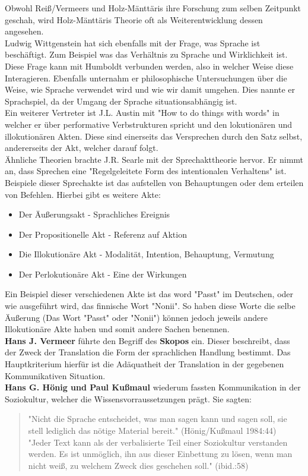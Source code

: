 \documentclass{article}
\begin{document}
	Obwohl Reiß/Vermeers und Holz-Mänttäris ihre Forschung zum selben Zeitpunkt geschah, wird Holz-Mänttäris Theorie oft als Weiterentwicklung dessen angesehen. \\
	Ludwig Wittgenstein hat sich ebenfalls mit der Frage, was Sprache ist beschäftigt. Zum Beispiel was das Verhältnis zu Sprache und Wirklichkeit ist. Diese Frage kann mit Humboldt verbunden werden, also in welcher Weise diese Interagieren. Ebenfalls unternahm er philosophische Untersuchungen über die Weise, wie Sprache verwendet wird und wie wir damit umgehen. Dies nannte er Sprachspiel, da der Umgang der Sprache situationsabhängig ist. \\
	Ein weiterer Vertreter ist J.L. Austin mit "How to do things with words" in welcher er über performative Verbstrukturen spricht und den lokutionären und illokutionären Akten. Diese sind einerseits das Versprechen durch den Satz selbst, andererseits der Akt, welcher darauf folgt. \\
	Ähnliche Theorien brachte J.R. Searle mit der Sprechakttheorie hervor. Er nimmt an, dass Sprechen eine "Regelgeleitete Form des intentionalen Verhaltens" ist. Beispiele dieser Sprechakte ist das aufstellen von Behauptungen oder dem erteilen von Befehlen.
	Hierbei gibt es weitere Akte:
	\begin{itemize}
		\item{Der Äußerungsakt - Sprachliches Ereignis}
		\item{Der Propositionelle Akt - Referenz auf Aktion}
		\item{Die Illokutionäre Akt - Modalität, Intention, Behauptung, Vermutung}
		\item{Der Perlokutionäre Akt - Eine der Wirkungen}
	\end{itemize}

	Ein Beispiel dieser verschiedenen Akte ist das word "Passt" im Deutschen, oder wie ausgeführt wird, das finnische Wort "Nonii". So haben diese Worte die selbe Äußerung (Das Wort "Passt" oder "Nonii") können jedoch jeweils andere Illokutionäre Akte haben und somit andere Sachen benennen. \\
	\textbf{Hans J. Vermeer} führte den Begriff des \textbf{Skopos} ein. Dieser beschreibt, dass der Zweck der Translation die Form der sprachlichen Handlung bestimmt. Das Hauptkriterium hierfür ist die Adäquatheit der Translation in der gegebenen Kommunikativen Situation. \\
	\textbf{Hans G. Hönig und Paul Kußmaul} wiederum fassten Kommunikation in der Soziokultur, welcher die Wissensvorraussetzungen prägt. Sie sagten:
	\begin{quote}
	"Nicht die Sprache entscheidet, was man sagen kann und sagen soll, sie stell lediglich das nötige Material bereit." (Hönig/Kußmaul 1984:44) \\
	"Jeder Text kann als der verbalisierte Teil einer Soziokultur verstanden werden. Es ist unmöglich, ihn aus dieser Einbettung zu lösen, wenn man nicht weiß, zu welchem Zweck dies geschehen soll." (ibid.:58)
	\end{quote}
\end{document}
